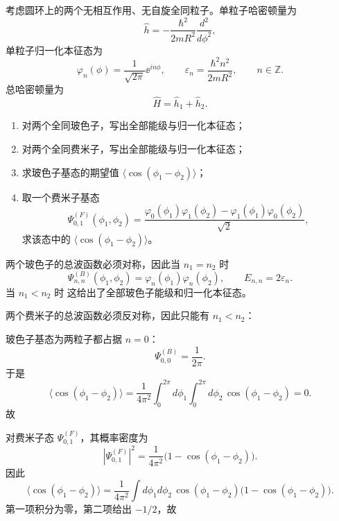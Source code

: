 \begin{question}
考虑圆环上的两个无相互作用、无自旋全同粒子。单粒子哈密顿量为
\[
\hat h=-\frac{\hbar^2}{2mR^2}\frac{d^2}{d\phi^2},
\]
单粒子归一化本征态为
\[
\varphi_n(\phi)=\frac{1}{\sqrt{2\pi}}\ee^{in\phi},
\qquad
\varepsilon_n=\frac{\hbar^2 n^2}{2mR^2},
\qquad n\in\mathbb Z.
\]
总哈密顿量为
\[
\hat H=\hat h_1+\hat h_2.
\]

\begin{enumerate}[label=(\arabic*),leftmargin=2.5em]
  \item 对两个全同玻色子，写出全部能级与归一化本征态；
  \item 对两个全同费米子，写出全部能级与归一化本征态；
  \item 求玻色子基态的期望值 $\langle \cos(\phi_1-\phi_2)\rangle$；
  \item 取一个费米子基态
  \[
  \Psi_{0,1}^{(F)}(\phi_1,\phi_2)=\frac{\varphi_0(\phi_1)\varphi_1(\phi_2)-\varphi_1(\phi_1)\varphi_0(\phi_2)}{\sqrt2},
  \]
  求该态中的 $\langle \cos(\phi_1-\phi_2)\rangle$。
\end{enumerate}

\begin{solution}
两个玻色子的总波函数必须对称，因此当 $n_1=n_2$ 时
\[
\Psi_{n,n}^{(B)}(\phi_1,\phi_2)=\varphi_n(\phi_1)\varphi_n(\phi_2),
\qquad
E_{n,n}=2\varepsilon_n.
\]
当 $n_1<n_2$ 时
这给出了全部玻色子能级和归一化本征态。

两个费米子的总波函数必须反对称，因此只能有 $n_1<n_2$：

玻色子基态为两粒子都占据 $n=0$：
\[
\Psi_{0,0}^{(B)}=\frac{1}{2\pi}.
\]
于是
\[
\langle \cos(\phi_1-\phi_2)\rangle
=\frac{1}{4\pi^2}\int_0^{2\pi}d\phi_1\int_0^{2\pi}d\phi_2\,\cos(\phi_1-\phi_2)=0.
\]
故

对费米子态 $\Psi_{0,1}^{(F)}$，其概率密度为
\[
|\Psi_{0,1}^{(F)}|^2=\frac{1}{4\pi^2}\bigl(1-\cos(\phi_1-\phi_2)\bigr).
\]
因此
\[
\langle \cos(\phi_1-\phi_2)\rangle
=\frac{1}{4\pi^2}\int d\phi_1d\phi_2\,\cos(\phi_1-\phi_2)\bigl(1-\cos(\phi_1-\phi_2)\bigr).
\]
第一项积分为零，第二项给出 $-1/2$，故
\end{solution}
\end{question}

